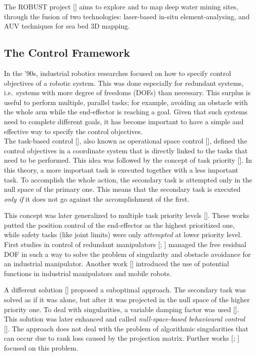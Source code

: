 The ROBUST project [\cite{IntroRobust}] aims to explore and to map deep water mining sites, through the fusion of two technologies: laser-based in-situ element-analysing, and AUV techniques for sea bed 3D mapping.


\subsection{The Control Framework}
\label{subsec:ControlFramework}
In the '90s, industrial robotics researches focused on how to specify control objectives of a robotic system. This was done especially for redundant systems, i.e.\, systems with more degree of freedoms (DOFs) than necessary. This surplus is useful to perform multiple, parallel tasks; for example, avoiding an obstacle with the whole arm while the end-effector is reaching a goal. Given that such systems need to complete different goals, it has become important to have a simple and effective way to specify the control objectives.\\


The task-based control [\cite{IntroTpik1}], also known as operational space control [\cite{IntroTpik2}], defined the control objectives in a coordinate system that is directly linked to the tasks that need to be performed. This idea was followed by the concept of task priority [\cite{IntroTpik3}]. In this theory, a more important task is executed together with a less important task. To accomplish the whole action, the secondary task is attempted only in the null space of the primary one. This means that the secondary task is executed \textit{only if} it does not go against the accomplishment of the first.

This concept was later generalized to multiple task priority levels [\cite{IntroTpik4}]. These works putted the position control of the end-effector as the highest prioritized one, while safety tasks (like joint limits) were only \textit{attempted} at lower priority level.\\


First studies in control of redundant manipulators [\cite{IntroTpik6}; \cite{IntroTpik5}] managed the free residual DOF in such a way to solve the problem of singularity and obstacle avoidance for an industrial manipulator. Another work [\cite{IntroTpik7}] introduced the use of potential functions in industrial manipulators and mobile robots.

A different solution [\cite{IntroTpik8}] proposed a suboptimal approach. The secondary task was solved as if it was alone, but after it was projected in the null space of the higher priority one. To deal with singularities, a variable damping factor was used [\cite{IntroTpik1}]. This solution was later enhanced and called \textit{null-space-based behavioural control} [\cite{IntroTpik9}].
The approach does not deal with the problem of algorithmic singularities that can occur due to rank loss caused by the projection matrix. Further works [\cite{IntroTpik11}; \cite{IntroTpik10}] focused on this problem.\\


